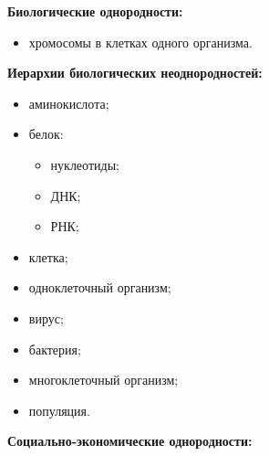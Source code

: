 \textbf{Биологические однородности:}


\begin{itemize}


\item хромосомы в клетках одного организма.


\end{itemize}





\textbf{Иерархии биологических неоднородностей:}


\begin{itemize}


\item аминокислота;\\[-14pt]


\item белок:


\begin{itemize}


\item нуклеотиды;\\[-14pt]


\item ДНК;\\[-14pt]


\item РНК;


\end{itemize}


\item клетка;\\[-14pt]


\item одноклеточный организм;\\[-14pt]


\item вирус;\\[-14pt]


\item бактерия;\\[-14pt]


\item многоклеточный организм;\\[-14pt]


\item популяция.


\end{itemize}





\textbf{Социально-экономические однородности:}


